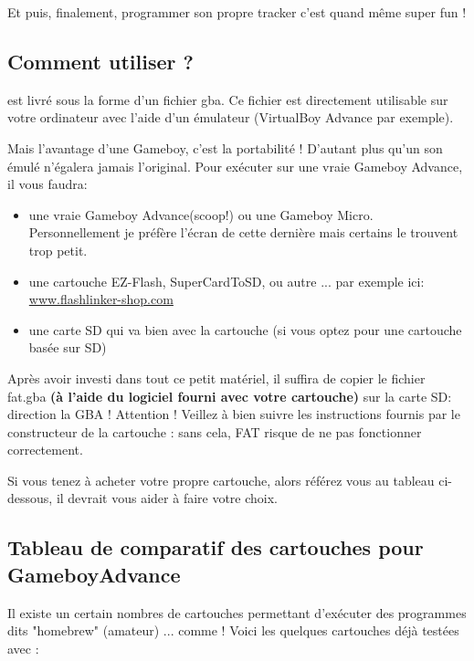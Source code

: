 \documentclass[12pt,a4paper]{article}
\begin{document}
    Et puis, finalement, programmer son propre tracker c'est quand même super fun ! 
    
    
    \subsection{Comment utiliser \FAT ?}

    \FAT est livré sous la forme d'un fichier gba. Ce fichier est directement utilisable sur votre ordinateur avec l'aide d'un émulateur (VirtualBoy Advance par exemple).\medskip
    
    Mais l'avantage d'une Gameboy, c'est la portabilité ! D'autant plus qu'un son émulé n'égalera jamais l'original. Pour exécuter \FAT sur une vraie Gameboy Advance, il vous faudra:
    \begin{itemize}
        \item{une vraie Gameboy Advance(scoop!) ou une Gameboy Micro. Personnellement je préfère l'écran de cette dernière mais certains le trouvent trop petit.}
        \item{une cartouche EZ-Flash, SuperCardToSD, ou autre ... par exemple ici: \href{http://www.flashlinker-shop.com/ez-flash-iv-minisd-slot-2-p-443.html}{www.flashlinker-shop.com}}
        \item{une carte SD qui va bien avec la cartouche (si vous optez pour une cartouche basée sur SD)} 
    \end{itemize}\medskip
    
    Après avoir investi dans tout ce petit matériel, il suffira de copier le fichier fat.gba {\bf (à l'aide du logiciel fourni avec votre cartouche)} sur la carte SD: direction la GBA ! Attention ! Veillez à bien suivre les instructions fournis par le constructeur de la cartouche : sans cela, FAT risque de ne pas fonctionner correctement.
    
    
    Si vous tenez à acheter votre propre cartouche, alors référez vous au tableau ci-dessous, il devrait vous aider à faire votre choix.
    
    \subsection{Tableau de comparatif des cartouches pour GameboyAdvance}
    
    Il existe un certain nombres de cartouches permettant d'exécuter des programmes dits "homebrew" (amateur) ... comme \FAT ! Voici les quelques cartouches déjà testées avec \FAT :
\end{document}
